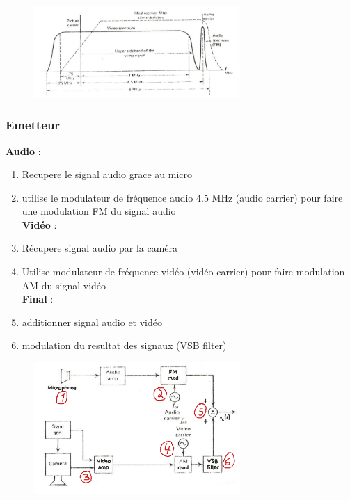 \documentclass[12pt]{article}
\begin{document}
				 \begin{figure}[htp]
				\centering
				\includegraphics[width=0.7\textwidth]{img/ModulationTVNoirBlanc.png}
				\end{figure}
			\subsubsection{Emetteur}
				\textbf{Audio} : 
				\begin{enumerate}
					\item Recupere le signal audio grace au micro
					\item utilise le modulateur de fréquence audio 4.5 MHz (audio carrier) pour faire une modulation FM du signal audio\\
					
				\textbf{Vidéo} : \\
					\item Récupere signal audio par la caméra
					\item Utilise modulateur de fréquence vidéo (vidéo carrier) pour faire modulation AM du signal vidéo\\
					
				\textbf{Final} :\\
				
				\item additionner signal audio et vidéo
				\item modulation du resultat des signaux (VSB filter)
				\end{enumerate}
				
				\begin{figure}[htp]
				\centering
				\includegraphics[width=0.7\textwidth]{img/EmetteruTVNoirBlanc.png}
				\end{figure}
				
\end{document}
